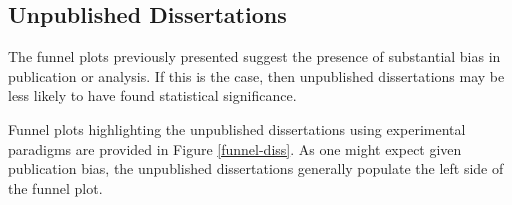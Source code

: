 \documentclass[man, mask]{apa6}
\begin{document}


\subsection{Unpublished Dissertations}
The funnel plots previously presented suggest the presence of substantial bias in publication or analysis. If this is the case, then unpublished dissertations may be less likely to have found statistical significance. 

Funnel plots highlighting the unpublished dissertations using experimental paradigms are provided in Figure \ref{funnel-diss}. As one might expect given publication bias, the unpublished dissertations generally populate the left side of the funnel plot. 
\end{document}
